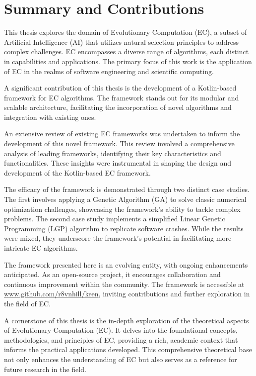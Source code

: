 \section{Summary and Contributions}
\label{sec:conclusions:summary}
    This thesis explores the domain of Evolutionary Computation (EC), a subset of Artificial Intelligence (AI) that 
    utilizes natural selection principles to address complex challenges. EC encompasses a diverse range of algorithms, 
    each distinct in capabilities and applications. The primary focus of this work is the application of EC in the 
    realms of software engineering and scientific computing.

    A significant contribution of this thesis is the development of a Kotlin-based framework for EC algorithms. The 
    framework stands out for its modular and scalable architecture, facilitating the incorporation of novel algorithms 
    and integration with existing ones.

    An extensive review of existing EC frameworks was undertaken to inform the development of this novel framework. This 
    review involved a comprehensive analysis of leading frameworks, identifying their key characteristics and 
    functionalities. These insights were instrumental in shaping the design and development of the Kotlin-based EC 
    framework.

    The efficacy of the framework is demonstrated through two distinct case studies. The first involves applying a 
    Genetic Algorithm (GA) to solve classic numerical optimization challenges, showcasing the framework's ability to 
    tackle complex problems. The second case study implements a simplified Linear Genetic Programming (LGP) algorithm to 
    replicate software crashes. While the results were mixed, they underscore the framework's potential in facilitating 
    more intricate EC algorithms.

    The framework presented here is an evolving entity, with ongoing enhancements anticipated. As an open-source 
    project, it encourages collaboration and continuous improvement within the community. The framework is accessible at 
    \url{www.github.com/r8vnhill/keen}, inviting contributions and further exploration in the field of EC.

    A cornerstone of this thesis is the in-depth exploration of the theoretical aspects of Evolutionary Computation 
    (EC). It delves into the foundational concepts, methodologies, and principles of EC, providing a rich, academic 
    context that informs the practical applications developed. This comprehensive theoretical base not only enhances the 
    understanding of EC but also serves as a reference for future research in the field.
    
